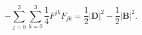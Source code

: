 \documentclass{article}
\theoremstyle{definition}
\theoremstyle{remark}
\renewcommand{\vec}[1]{\mathbf{#1}}
\begin{document}
\begin{comment}
the scalar field on the group $\mathcal{S}_0$: $L_e$, defined as:
\begin{equation}\label{MaxVacFullPPNhjjghjjkjhhint}
L_e:=\sum_{j=0}^{3}\sum_{k=0}^{3}F^{jk}F_{jk},
\end{equation}
satisfies
\begin{multline}\label{MaxVacFullPPNhjjghjjkjhh1int}
L_e=F^{00}F_{00}+\sum_{k=1}^{3}F^{0k}F_{0k}+\sum_{j=1}^{3}F^{j0}F_{j0}+\sum_{j=1}^{3}\sum_{k=1}^{3}F^{jk}F_{jk}=-2\vec
E\cdot\vec D+2\vec B\cdot\vec H=\\-2\left(\left(\vec
D-\frac{1}{c}\,\vec v\times \vec B\right)\cdot\vec D-\vec
B\cdot\left(\vec B+\frac{1}{c}\,\vec v\times \vec
D\right)\right)=-2\left(|\vec D|^2-|\vec B|^2\right).
\end{multline}
\end{comment}
%
%
%
\begin{equation}\label{MaxVacFullPPNhjjghjjkjhh1int}
-\sum_{j=0}^{3}\sum_{k=0}^{3}\frac{1}{4}F^{jk}F_{jk}=\frac{1}{2}|\vec
D|^2-\frac{1}{2}|\vec B|^2.
\end{equation}
\end{document}
